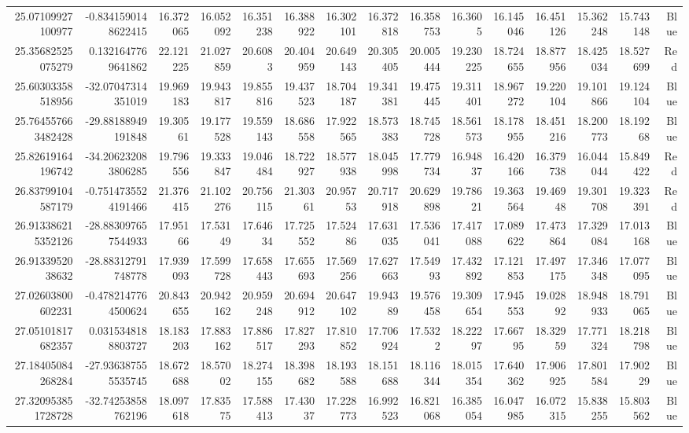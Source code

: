 \begin{center}
\begin{longtable}{rrrrrrrrrrrrrrr}
25.07109927100977 & -0.8341590148622415 & 16.372065 & 16.052092 & 16.351238 & 16.388922 & 16.302101 & 16.372818 & 16.358753 & 16.3605 & 16.145046 & 16.451126 & 15.362248 & 15.743148 & Blue \\
25.35682525075279 & 0.1321647769641862 & 22.121225 & 21.027859 & 20.6083 & 20.404959 & 20.649143 & 20.305405 & 20.005444 & 19.230225 & 18.724655 & 18.877956 & 18.425034 & 18.527699 & Red \\
25.60303358518956 & -32.07047314351019 & 19.969183 & 19.943817 & 19.855816 & 19.437523 & 18.704187 & 19.341381 & 19.475445 & 19.311401 & 18.967272 & 19.220104 & 19.101866 & 19.124104 & Blue \\
25.764557663482428 & -29.88188949191848 & 19.30561 & 19.177528 & 19.559143 & 18.686558 & 17.922565 & 18.573383 & 18.745728 & 18.561573 & 18.178955 & 18.451216 & 18.200773 & 18.19268 & Blue \\
25.82619164196742 & -34.206232083806285 & 19.796556 & 19.333847 & 19.046484 & 18.722927 & 18.577938 & 18.045998 & 17.779734 & 16.94837 & 16.420166 & 16.379738 & 16.044044 & 15.849422 & Red \\
26.83799104587179 & -0.7514735524191466 & 21.376415 & 21.102276 & 20.756115 & 21.30361 & 20.95753 & 20.717918 & 20.629898 & 19.78621 & 19.363564 & 19.46948 & 19.301708 & 19.323391 & Red \\
26.913386215352126 & -28.883097657544933 & 17.95166 & 17.53149 & 17.64634 & 17.725552 & 17.52486 & 17.631035 & 17.536041 & 17.417088 & 17.089622 & 17.473864 & 17.329084 & 17.013168 & Blue \\
26.9133952038632 & -28.88312791748778 & 17.939093 & 17.599728 & 17.658443 & 17.655693 & 17.569256 & 17.627663 & 17.54993 & 17.432892 & 17.121853 & 17.497175 & 17.346348 & 17.077095 & Blue \\
27.02603800602231 & -0.4782147764500624 & 20.843655 & 20.942162 & 20.959248 & 20.694912 & 20.647102 & 19.94389 & 19.576458 & 19.309654 & 17.945553 & 19.02892 & 18.948933 & 18.791065 & Blue \\
27.05101817682357 & 0.0315348188803727 & 18.183203 & 17.883162 & 17.886517 & 17.827293 & 17.810852 & 17.706924 & 17.5322 & 18.22297 & 17.66795 & 18.32959 & 17.771324 & 18.218798 & Blue \\
27.18405084268284 & -27.936387555535745 & 18.672688 & 18.57002 & 18.274155 & 18.398682 & 18.193588 & 18.151688 & 18.116344 & 18.015354 & 17.640362 & 17.906925 & 17.801584 & 17.90229 & Blue \\
27.320953851728728 & -32.74253858762196 & 18.097618 & 17.83575 & 17.588413 & 17.43037 & 17.228773 & 16.992523 & 16.821068 & 16.385054 & 16.047985 & 16.072315 & 15.838255 & 15.803562 & Blue \\

\end{longtable}
\end{center}
